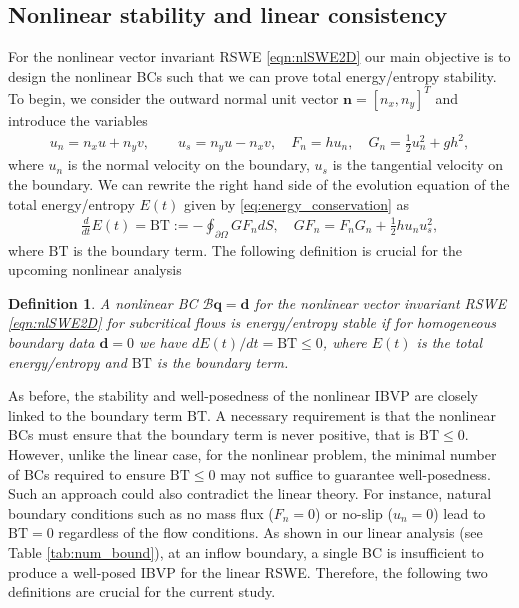\documentclass{article}
\numberwithin{equation}{section}
\newtheorem{definition}{Definition}
\theoremstyle{definition}
\begin{document}
\subsection{Nonlinear stability and linear consistency}
For the nonlinear vector invariant RSWE \eqref{eqn:nlSWE2D} our main objective is to design the nonlinear BCs such that we can prove total energy/entropy stability.
To begin, we consider the outward normal unit vector $\mathbf{n} = [n_x, n_y]^T$ and  introduce the variables
\begin{align}\label{eq:boundary-fields}
    u_n = n_xu + n_y v, \quad \quad u_s = n_yu - n_x v, \quad F_n = hu_n, \quad G_n = \frac12 u_n^2 + gh^2,
\end{align}
%
where $u_n$ is the normal velocity on the boundary, $u_s$ is the tangential velocity on the boundary.
We can rewrite the right hand side of the evolution equation of the total energy/entropy $E(t)$ given by \eqref{eq:energy_conservation} as
\begin{align}\label{eq:energy_conservation_2}
 \frac{d}{dt}E(t) =\mathrm{BT}:= -\oint_{\partial \Omega} G F_n dS, \quad G F_n = F_nG_n + \frac{1}{2} hu_n u_s^2,
\end{align}
where $\mathrm{BT}$ is the boundary term.
The following definition is crucial for the upcoming nonlinear analysis
\begin{definition}
    A nonlinear BC $\mathcal{B}\mathbf{q}=\mathbf{d}$ for the nonlinear vector invariant RSWE \eqref{eqn:nlSWE2D} for subcritical flows is energy/entropy stable if for homogeneous boundary data $\mathbf{d} =0$ we have $dE(t)/dt = \mathrm{BT} \le 0$, where $E(t)$ is the total energy/entropy and $\mathrm{BT}$ is the boundary term.
\end{definition}
\noindent
As before, the stability and well-posedness of the nonlinear IBVP are closely linked to the boundary term $\mathrm{BT}$. A necessary requirement is that the nonlinear BCs must ensure that the boundary term is never positive, that is $\mathrm{BT}\le 0$. However, unlike the linear case, for the nonlinear problem, the minimal number of BCs required to ensure $\mathrm{BT} \le 0$ may not suffice to guarantee well-posedness. Such an approach could also contradict the linear theory. For instance, natural boundary conditions such as no mass flux ($F_n=0$) or no-slip ($u_n=0$) lead to $\mathrm{BT} = 0$ regardless of the flow conditions. As shown in our linear analysis (see Table \ref{tab:num_bound}), at an inflow boundary, a single BC is insufficient to produce a well-posed IBVP for the linear RSWE. Therefore, the following two definitions are crucial for the current study.
\end{document}
